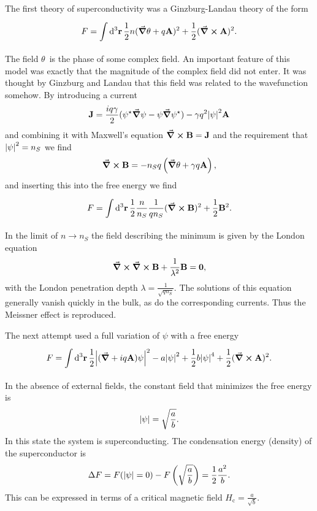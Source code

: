 The first theory of superconductivity was a Ginzburg-Landau theory of the form
\begin{align*}
	F = \int\limits_{}^{}\dd[3]{\vb{r}}\frac{1}{2}n(\grad{\theta} + q\vb{A})^{2} + \frac{1}{2}(\curl{\vb{A}})^{2}.
\end{align*}
The field $\theta$ is the phase of some complex field. An important feature of this model was exactly that the magnitude of the complex field did not enter. It was thought by Ginzburg and Landau that this field was related to the wavefunction somehow. By introducing a current
\begin{align*}
	\vb{J} = \frac{iq\gamma}{2}(\psi^{\star}\grad{\psi} - \psi\grad{\psi\ensuremath{^{\star}}}) - \gamma q^{2}\abs{\psi}^{2}\vb{A}
\end{align*}
and combining it with Maxwell's equation $\curl{\vb{B}} = \vb{J}$ and the requirement that $\abs{\psi}^{2} = n_{S}$ we find
\begin{align*}
	\curl{\vb{B}} = -n_{S}q\left(\grad{\theta} + \gamma q\vb{A}\right),
\end{align*}
and inserting this into the free energy we find
\begin{align*}
	F = \int\limits_{}^{}\dd[3]{\vb{r}}\frac{1}{2}\frac{n}{n_{S}}\frac{1}{qn_{S}}(\curl{\vb{B}})^{2} + \frac{1}{2}\vb{B}^{2}.
\end{align*}
In the limit of $n\to n_{S}$ the field describing the minimum is given by the London equation
\begin{align*}
	\curl{\curl{\vb{B}}} + \frac{1}{\lambda^{2}}\vb{B} = \vb{0},
\end{align*}
with the London penetration depth $\lambda = \frac{1}{\sqrt{qn_{S}}}$. The solutions of this equation generally vanish quickly in the bulk, as do the corresponding currents. Thus the Meissner effect is reproduced.

The next attempt used a full variation of $\psi$ with a free energy
\begin{align*}
	F = \int\limits_{}^{}\dd[3]{\vb{r}}\frac{1}{2}\abs{(\grad{} + iq\vb{A})\psi}^{2} - a\abs{\psi}^{2} + \frac{1}{2}b\abs{\psi}^{4} + \frac{1}{2}(\curl{\vb{A}})^{2}.
\end{align*}
In the absence of external fields, the constant field that minimizes the free energy is
\begin{align*}
	\abs{\psi} = \sqrt{\frac{a}{b}}.
\end{align*}
In this state the system is superconducting. The condensation energy (density) of the superconductor is
\begin{align*}
	\Delta F = F(\abs{\psi} = 0) - F\left(\sqrt{\frac{a}{b}}\right) = \frac{1}{2}\frac{a^{2}}{b}.
\end{align*}
This can be expressed in terms of a critical magnetic field $H_{\text{c}} = \frac{a}{\sqrt{b}}$.

